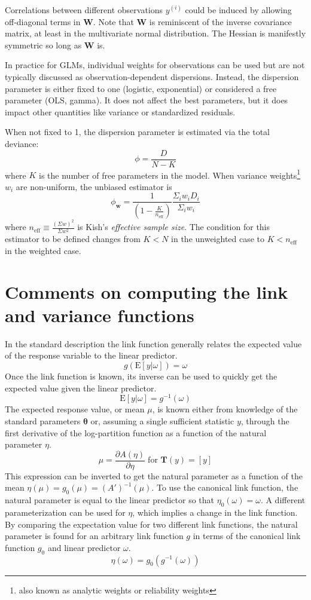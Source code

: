 \documentclass{article}
\begin{document}
Correlations between different observations \(y^{(i)}\) could be induced by
allowing off-diagonal terms in \(\mathbf{W}\). Note that \(\mathbf{W}\) is
reminiscent of the inverse covariance matrix, at least in the multivariate
normal distribution. The Hessian is manifestly symmetric so long as
\(\mathbf{W}\) is.

In practice for GLMs, individual weights for observations can be used but are
not typically discussed as observation-dependent dispersions. Instead, the
dispersion parameter is either fixed to one (logistic, exponential) or
considered a free parameter (OLS, gamma). It does not affect the best
parameters, but it does impact other quantities like variance or standardized
residuals.

When not fixed to 1, the dispersion parameter is estimated via the total deviance:
\[\phi = \frac{D}{N - K} \]
where \(K\) is the number of free parameters in the model.
When variance weights\footnote{also known as analytic weights or reliability
weights} $w_i$ are non-uniform, the unbiased estimator is
\[\phi_{\mathbf{w}} = \frac{1}{\left(1 - \frac{K}{n_\mathrm{eff}}\right)} \frac{\Sigma_i w_i D_i}{\Sigma_i w_i} \]
where \(n_\mathrm{eff} \equiv \frac{\left(\Sigma w\right)^2}{\Sigma w^2} \) is Kish's
\emph{effective sample size}. The condition for this estimator to be defined
changes from \(K < N\) in the unweighted case to \(K < n_\mathrm{eff}\) in the
weighted case.

\section{Comments on computing the link and variance functions}

In the standard description the link function generally relates the expected
value of the response variable to the linear predictor.
\[ g(\textrm{E}[y|\omega]) = \omega \]
Once the link function is known, its inverse can be used to quickly get the
expected value given the linear predictor.
\[ \textrm{E}[y|\omega] = g^{-1}(\omega) \]
The expected response value, or mean \(\mu\), is known either from knowledge
of the standard parameters \(\boldsymbol{\theta}\) or, assuming a single
sufficient statistic \(y\), through the first derivative of the log-partition
function as a function of the natural parameter \(\eta\).
\[ \mu = \frac{\partial A(\eta)}{\partial \eta} \; \textrm{for } \mathbf{T}(y)
= [y]\]
This expression can be inverted to get the natural parameter as a function of the
mean \(\eta(\mu) = g_0(\mu) = (A')^{-1}(\mu)\).
To use the canonical link function, the natural parameter is equal to the linear
predictor so that \( \eta_0(\omega) = \omega \).
A different parameterization can be used for \(\eta\), which implies a change
in the link function.
By comparing the expectation value for
two different link functions, the natural parameter is found for an arbitrary link
function $g$ in terms of the canonical link function $g_0$ and linear predictor
$\omega$.
\[ \eta(\omega) = g_0 \left( g^{-1} (\omega) \right) \]
\end{document}
